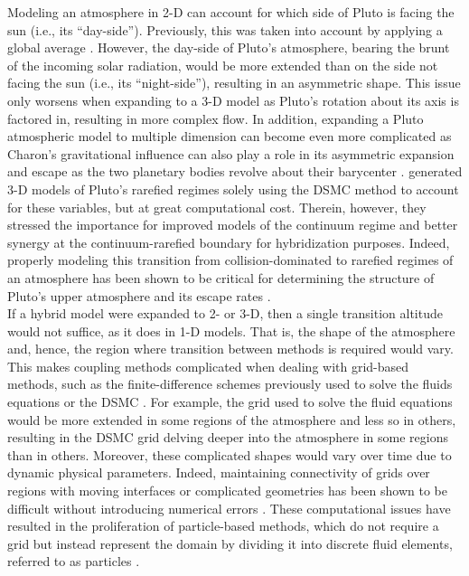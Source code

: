 \documentclass[times,12]{article}
\begin{document}
Modeling an atmosphere in 2-D can account for which side of Pluto is facing the sun (i.e., its ``day-side''). Previously, this was taken into account by applying a global average \citep{Strobel2008, Erwin2013}. However, the day-side of Pluto's atmosphere, bearing the brunt of the incoming solar radiation, would be more extended than on the side not facing the sun (i.e., its ``night-side''), resulting in an asymmetric shape. This issue only worsens when expanding to a 3-D model as Pluto's rotation about its axis is factored in, resulting in more complex flow. In addition, expanding a Pluto atmospheric model to multiple dimension can become even more complicated as Charon's gravitational influence can also play a role in its asymmetric expansion and escape as the two planetary bodies revolve about their barycenter \citep{Tucker2015, Hoey2017a}. \cite{Hoey2017a} generated 3-D models of Pluto's rarefied regimes solely using the DSMC method to account for these variables, but at great computational cost. Therein, however, they stressed the importance for improved models of the continuum regime and better synergy at the continuum-rarefied boundary for hybridization purposes. Indeed, properly modeling this transition from collision-dominated to rarefied regimes of an atmosphere has been shown to be critical for determining the structure of Pluto's upper atmosphere and its escape rates \citep{Tucker2009, Tucker2012}.\\
\indent If a hybrid model were expanded to 2- or 3-D, then a single transition altitude would not suffice, as it does in 1-D models. That is, the shape of the atmosphere and, hence, the region where transition between methods is required would vary. This makes coupling methods complicated when dealing with grid-based methods, such as the finite-difference schemes previously used to solve the fluids equations \citep{Strobel2008, Tucker2012, Erwin2013} or the DSMC \citep{Bird1994}. For example, the grid used to solve the fluid equations would be more extended in some regions of the atmosphere and less so in others, resulting in the DSMC grid delving deeper into the atmosphere in some regions than in others. Moreover, these complicated shapes would vary over time due to dynamic physical parameters. Indeed, maintaining connectivity of grids over regions with moving interfaces or complicated geometries has been shown to be difficult without introducing numerical errors \citep{liu2010, ni2016}. These computational issues have resulted in the proliferation of particle-based methods, which do not require a grid but instead represent the domain by dividing it into discrete fluid elements, referred to as particles \citep{monaghan1992, monaghan2005}.\\
\end{document}
